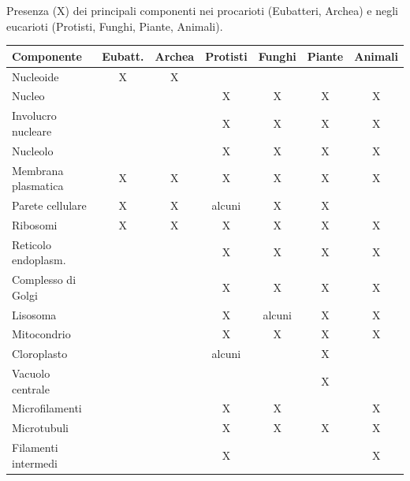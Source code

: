 Presenza (X) dei principali componenti nei procarioti (Eubatteri, Archea) e negli eucarioti (Protisti, Funghi, Piante, Animali).
\begin{table}[htbp]
  \centering \footnotesize \renewcommand{\arraystretch}{1.15}
  \begin{tabular}{|l|c|c|c|c|c|c|}
    \hline
    \textbf{Componente} & \textbf{Eubatt.} & \textbf{Archea} & \textbf{Protisti} & \textbf{Funghi} & \textbf{Piante} & \textbf{Animali} \\
    \hline
    Nucleoide            & X & X &        &        &   &   \\ \hline
    Nucleo               &   &   & X      & X      & X & X \\ \hline
    Involucro nucleare   &   &   & X      & X      & X & X \\ \hline
    Nucleolo             &   &   & X      & X      & X & X \\ \hline
    Membrana plasmatica  & X & X & X      & X      & X & X \\ \hline
    Parete cellulare     & X & X & alcuni & X      & X &   \\ \hline
    Ribosomi             & X & X & X      & X      & X & X \\ \hline
    Reticolo endoplasm.  &   &   & X      & X      & X & X \\ \hline
    Complesso di Golgi   &   &   & X      & X      & X & X \\ \hline
    Lisosoma             &   &   & X      & alcuni & X & X \\ \hline
    Mitocondrio          &   &   & X      & X      & X & X \\ \hline
    Cloroplasto          &   &   & alcuni &        & X &   \\ \hline
    Vacuolo centrale     &   &   &        &        & X &   \\ \hline
    Microfilamenti       &   &   & X      & X      &   & X \\ \hline
    Microtubuli          &   &   & X      & X      & X & X \\ \hline
    Filamenti intermedi  &   &   & X      &        &   & X \\ \hline
  \end{tabular}
\end{table}
